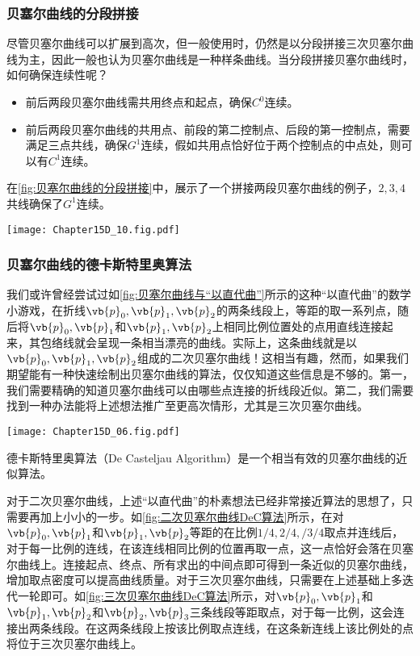 \subsubsection{贝塞尔曲线的分段拼接}
尽管贝塞尔曲线可以扩展到高次，但一般使用时，仍然是以分段拼接三次贝塞尔曲线为主，因此一般也认为贝塞尔曲线是一种样条曲线。当分段拼接贝塞尔曲线时，如何确保连续性呢？
\begin{itemize}
    \item 前后两段贝塞尔曲线需共用终点和起点，确保$C^0$连续。
    \item 前后两段贝塞尔曲线的共用点、前段的第二控制点、后段的第一控制点，需要满足三点共线，确保$G^1$连续，假如共用点恰好位于两个控制点的中点处，则可以有$C^1$连续。
\end{itemize}

在\cref{fig:贝塞尔曲线的分段拼接}中，展示了一个拼接两段贝塞尔曲线的例子，$2,3,4$共线确保了$G^1$连续。
\begin{Figure}[贝塞尔曲线的分段拼接]
    \texttt{[image: Chapter15D\_10.fig.pdf]}
\end{Figure}

\subsubsection{贝塞尔曲线的德卡斯特里奥算法}
我们或许曾经尝试过如\cref{fig:贝塞尔曲线与“以直代曲”}所示的这种“以直代曲”的数学小游戏，在折线$\vb{p}_0,\vb{p}_1,\vb{p}_2$的两条线段上，等距的取一系列点，随后将$\vb{p}_0,\vb{p}_1$和$\vb{p}_1,\vb{p}_2$上相同比例位置处的点用直线连接起来，其包络线就会呈现一条相当漂亮的曲线。实际上，这条曲线就是以$\vb{p}_0,\vb{p}_1,\vb{p}_2$组成的二次贝塞尔曲线！这相当有趣，然而，如果我们期望能有一种快速绘制出贝塞尔曲线的算法，仅仅知道这些信息是不够的。第一，我们需要精确的知道贝塞尔曲线可以由哪些点连接的折线段近似。第二，我们需要找到一种办法能将上述想法推广至更高次情形，尤其是三次贝塞尔曲线。
\begin{Figure}
    \texttt{[image: Chapter15D\_06.fig.pdf]}
\end{Figure}

德卡斯特里奥算法（De Casteljau Algorithm）是一个相当有效的贝塞尔曲线的近似算法。

对于二次贝塞尔曲线，上述“以直代曲”的朴素想法已经非常接近算法的思想了，只需要再加上小小的一步。如\cref{fig:二次贝塞尔曲线DeC算法}所示，在对$\vb{p}_0,\vb{p}_1$和$\vb{p}_1,\vb{p}_2$等距的在比例$1/4,2/4,/3/4$取点并连线后，对于每一比例的连线，在该连线相同比例的位置再取一点，这一点恰好会落在贝塞尔曲线上。连接起点、终点、所有求出的中间点即可得到一条近似的贝塞尔曲线，增加取点密度可以提高曲线质量。对于三次贝塞尔曲线，只需要在上述基础上多迭代一轮即可。如\cref{fig:三次贝塞尔曲线DeC算法}所示，对$\vb{p}_0,\vb{p}_1$和$\vb{p}_1,\vb{p}_2$和$\vb{p}_2,\vb{p}_3$三条线段等距取点，对于每一比例，这会连接出两条线段。在这两条线段上按该比例取点连线，在这条新连线上该比例处的点将位于三次贝塞尔曲线上。

